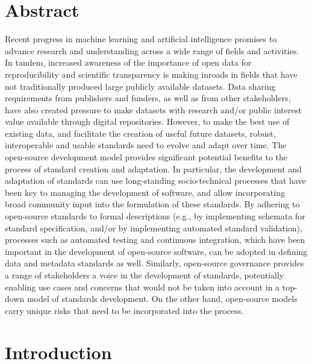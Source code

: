 \documentclass[
  number]{elsarticle}
\begin{document}
\section{Abstract}\label{abstract}

Recent progress in machine learning and artificial intelligence promises
to advance research and understanding across a wide range of fields and
activities. In tandem, increased awareness of the importance of open
data for reproducibility and scientific transparency is making inroads
in fields that have not traditionally produced large publicly available
datasets. Data sharing requirements from publishers and funders, as well
as from other stakeholders, have also created pressure to make datasets
with research and/or public interest value available through digital
repositories. However, to make the best use of existing data, and
facilitate the creation of useful future datasets, robust, interoperable
and usable standards need to evolve and adapt over time. The open-source
development model provides significant potential benefits to the process
of standard creation and adaptation. In particular, the development and
adaptation of standards can use long-standing socio-technical processes
that have been key to managing the development of software, and allow
incorporating broad community input into the formulation of these
standards. By adhering to open-source standards to formal descriptions
(e.g., by implementing schemata for standard specification, and/or by
implementing automated standard validation), processes such as automated
testing and continuous integration, which have been important in the
development of open-source software, can be adopted in defining data and
metadata standards as well. Similarly, open-source governance provides a
range of stakeholders a voice in the development of standards,
potentially enabling use cases and concerns that would not be taken into
account in a top-down model of standards development. On the other hand,
open-source models carry unique risks that need to be incorporated into
the process.

\section{Introduction}\label{sec-intro}
\end{document}
